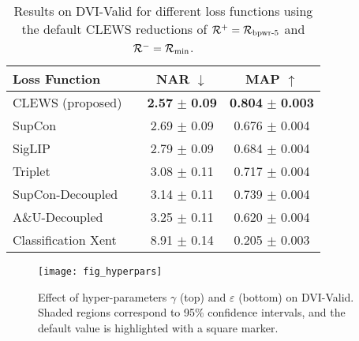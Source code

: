 \begin{table}[t]
\caption{Results on DVI-Valid for different loss functions using the default CLEWS reductions of $\mathcal{R}^+=\mathcal{R}_{\text{bpwr-5}}$ and $\mathcal{R}^-=\mathcal{R}_{\text{min}}$. %
\vspace{-0.6cm}
}
\label{tab:loss}
\tablecaptionspace
\begin{center}
\begin{small}
\begin{sc}
\begin{tabular}{llcc}
\toprule
Loss Function & & \textsc{NAR} $\downarrow$ & \textsc{MAP} $\uparrow$ \\
\midrule
CLEWS (proposed)  & & \textbf{2.57} $\pm$ \textbf{0.09} & \textbf{0.804} $\pm$ \textbf{0.003} \\
SupCon            & & 2.69 $\pm$ 0.09 & 0.676 $\pm$ 0.004 \\
SigLIP            & & 2.79 $\pm$ 0.09 & 0.684 $\pm$ 0.004 \\
Triplet           & & 3.08 $\pm$ 0.11 & 0.717 $\pm$ 0.004 \\
SupCon-Decoupled  & & 3.14 $\pm$ 0.11 & 0.739 $\pm$ 0.004 \\
A\&U-Decoupled    & & 3.25 $\pm$ 0.11 & 0.620 $\pm$ 0.004 \\
Classification Xent & & 8.91 $\pm$ 0.14 & 0.205 $\pm$ 0.003 \\
\bottomrule
\end{tabular}
\end{sc}
\end{small}
\end{center}
\vskip -0.1in
\end{table}

\begin{figure}[t]
\vskip 0.1in
\centerline{\texttt{[image: fig\_hyperpars]}}
\figurecaptionspace
\caption{Effect of hyper-parameters $\gamma$ (top) and $\varepsilon$ (bottom) on DVI-Valid. Shaded regions correspond to 95\% confidence intervals, and the default value is highlighted with a square marker.}
\label{fig:hyperpars}
\end{figure}

